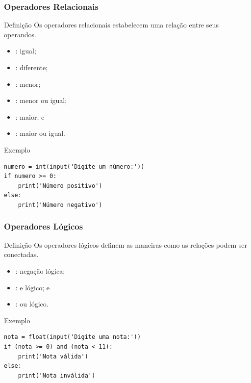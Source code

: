 \documentclass[aspectratio=169]{beamer} %
\begin{document}
\begin{frame}[fragile]
\frametitle{Operadores Relacionais}

\begin{block}{Definição}
	Os operadores relacionais estabelecem uma relação entre seus operandos.
\end{block} \vfill

\begin{itemize}
	\item \structure{==} : igual;
	\item \structure{!=} : diferente;
	\item \structure{<} : menor;
	\item \structure{<=} : menor ou igual;
	\item \structure{>} : maior; e
	\item \structure{>=} : maior ou igual.
\end{itemize}\vfill

\begin{exampleblock}{Exemplo}
	\begin{lstlisting}
numero = int(input('Digite um número:'))
if numero >= 0:
    print('Número positivo')
else:
    print('Número negativo')
	\end{lstlisting}
\end{exampleblock}

\end{frame}

\begin{frame}[fragile]
\frametitle{Operadores Lógicos}

\begin{block}{Definição}
Os operadores lógicos definem as maneiras como as relações podem ser conectadas.
\end{block} \vfill

\begin{itemize}
	\item {} : negação lógica;
	\item {} : e lógico; e
	\item {} : ou lógico.
\end{itemize}\vfill

\begin{exampleblock}{Exemplo}
	\begin{lstlisting}
nota = float(input('Digite uma nota:'))
if (nota >= 0) and (nota < 11):
    print('Nota válida')
else:
    print('Nota inválida')
	\end{lstlisting}
\end{exampleblock}
\end{frame}
\end{document}
